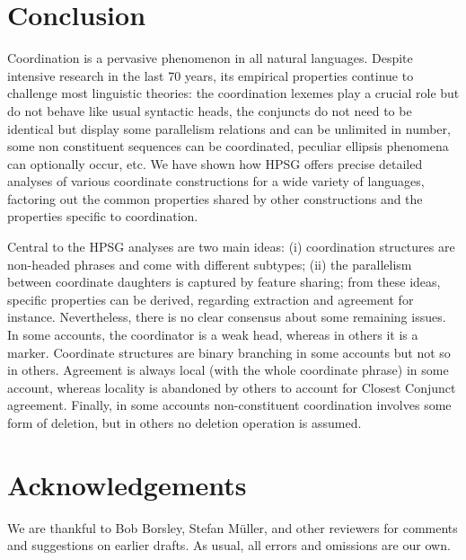 \documentclass[output=paper]{langsci/langscibook}
\begin{document}
\section{Conclusion}

Coordination is a pervasive phenomenon in all natural languages. Despite intensive research in the last 70 years, its empirical properties continue to challenge most linguistic theories:  the coordination lexemes play a crucial role but do not behave like usual syntactic heads, the conjuncts do not need to be identical but display some parallelism relations and can be unlimited in number, some non constituent sequences can be coordinated, peculiar ellipsis phenomena can optionally occur,  etc. We have shown how HPSG offers precise detailed analyses of various coordinate constructions for a wide variety of languages, factoring out the common properties shared by other constructions and the properties specific to coordination.

Central to the HPSG analyses are two main ideas: (i) coordination structures are non-headed phrases and come with different subtypes; (ii) the parallelism between coordinate daughters is captured by feature sharing; from these ideas, specific properties can be derived, regarding extraction and agreement for instance. Nevertheless, there is no clear consensus about some remaining issues. In some accounts, the coordinator is a weak head, whereas in others it is a marker. Coordinate structures are binary branching in some accounts but not so in others. Agreement is always local (with the whole coordinate phrase) in some account, whereas locality is abandoned by others to account for Closest Conjunct agreement. Finally, in some accounts non-constituent coordination involves some form of deletion, but in others no deletion operation is assumed.

 
\section*{Acknowledgements}

We are thankful to Bob Borsley, Stefan M\"{u}ller, and other reviewers for comments and suggestions on earlier drafts. 
As usual, all errors and omissions are our own.


{\sloppy
\printbibliography[heading=subbibliography,notkeyword=this] 
}
\end{document}
